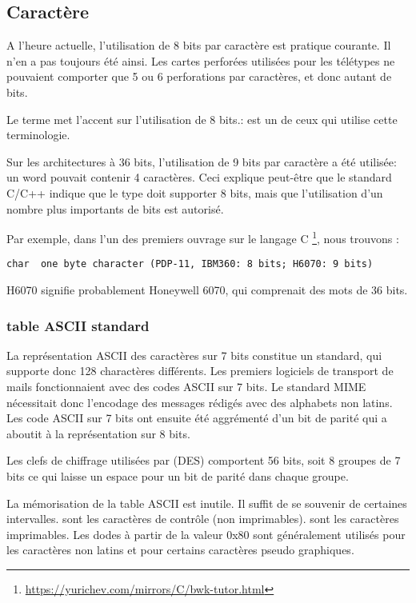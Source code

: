 \subsection{Caractère}

A l'heure actuelle, l'utilisation de 8 bits par caractère est pratique courante.
Il n'en a pas toujours été ainsi.
Les cartes perforées utilisées pour les télétypes ne pouvaient comporter que 5 ou 6 perforations par caractères, et donc autant de bits.

Le terme  met l'accent sur l'utilisation de 8 bits.:
 est un de ceux qui utilise cette terminologie.

Sur les architectures à 36 bits, l'utilisation de 9 bits par caractère a été utilisée: un \gls{word} pouvait contenir 4 caractères.
Ceci explique peut-être que le standard C/C++ indique que le type  doit supporter  8 bits, mais que l'utilisation
d'un nombre plus importants de bits est autorisé.

Par exemple, dans l'un des premiers ouvrage sur le langage C \footnote{\url{https://yurichev.com/mirrors/C/bwk-tutor.html}}, nous trouvons :

\begin{lstlisting}
char  one byte character (PDP-11, IBM360: 8 bits; H6070: 9 bits)
\end{lstlisting}

H6070 signifie probablement Honeywell 6070, qui comprenait des mots de 36 bits.

\subsubsection{table ASCII standard}

La représentation ASCII des caractères sur 7 bits constitue un standard, qui supporte donc 128 charactères différents.
Les premiers logiciels de transport de mails fonctionnaient avec des codes ASCII sur 7 bits.
Le standard \ac{MIME} nécessitait donc l'encodage des messages rédigés avec des alphabets non latins.
Les code ASCII sur 7 bits ont ensuite été aggrémenté d'un bit de parité qui a aboutit à la représentation sur 8 bits.

Les clefs de chiffrage utilisées par  (\ac{DES}) comportent 56 bits, soit 8 groupes de 7 bits
ce qui laisse un espace pour un bit de parité dans chaque groupe.

La mémorisation de la table \ac{ASCII} est inutile. Il suffit de se souvenir de certaines intervalles.
 sont les caractères de contrôle (non imprimables).
 sont les caractères imprimables.
Les dodes à partir de la valeur 0x80 sont généralement utilisés pour les caractères non latins et pour certains caractères pseudo graphiques.


